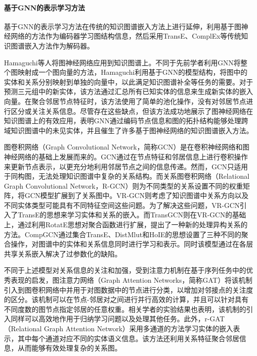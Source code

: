 \paragraph{基于GNN的表示学习方法}
基于GNN的表示学习方法在传统的知识图谱嵌入方法上进行延伸，利用基于图神经网络的方法作为编码器学习图结构信息，然后采用TransE、ComplEx等传统知识图谱嵌入方法作为解码器。

Hamaguchi\cite{hamaguchi2017knowledge}等人将图神经网络应用到知识图谱上。不同于先前学者利用GNN将整个图映射成一个图向量的方法，Hamaguchi利用基于GNN的模型结构，将图中的实体和关系分别映射到单独的向量中，以此满足知识图谱补全等任务的需要。对于预测三元组中的新实体，该方法通过汇总所有已知实体的信息来生成新实体的嵌入向量。在聚合邻居节点特征时，该方法使用了简单的池化操作，没有对邻居节点进行区分或关注关系信息。尽管存在这些缺点，但该方法成功地展示了图神经网络在知识图谱上的有效应用，表明GNN通过编码节点信息和图的拓扑结构能够处理跨域知识图谱中的未见实体，并且催生了许多基于图神经网络的知识图谱嵌入方法。

图卷积网络\cite{kipf2016semi}（Graph Convolutional Network，简称GCN）是在卷积神经网络和图神经网络的基础上发展而来的。GCN通过在节点特征和邻居信息上进行卷积操作来更新节点表示，以更充分地利用邻居节点之间的信息传递。然而，GCN只适用于同构图，无法处理知识图谱中复杂的关系结构。而关系图卷积网络\cite{schlichtkrull2018modeling}（Relational Graph Convolutional Network，R-GCN）则为不同类型的关系设置不同的权重矩阵，将GCN模型扩展到了关系图中。VR-GCN\cite{ye2019vectorized}则考虑了知识图谱中关系方向以及不同实体类型可能具有不同特征空间这些问题。为了解决这些问题，VR-GCN引入了TransE的思想来学习实体和关系的嵌入。而TransGCN\cite{cai2019transgcn}则在VR-GCN的基础上，通过利用RotatE思想对聚合函数进行扩展，提出了一种新的处理异构关系的方法。CompGCN\cite{vashishth2019composition}通过集合TransE、DistMlut和HoIE的思想设置了三种不同的聚合操作，对图谱中的实体和关系信息同时进行学习和表示。同时该模型通过在各层共享关系嵌入解决了过参数化的缺陷。

不同于上述模型对关系信息的关注和加强，受到注意力机制在基于序列任务中的优秀表现的启发，图注意力网络\cite{nathani2019learning}（Graph Attention Networks，简称GAT）将该机制引入到图卷积网络中并用于对图数据中的节点进行分类，以增加对邻接点的关注度的区分。该机制可以在节点-邻居对之间进行并行高效的计算，并且可以针对具有不同度数的图节点指定邻居的任意权重。相关学者的实验结果也表明，该机制的引入同样可以高效地作用于归纳学习问题以及处理其他任务。此外，r-GAT\cite{chen2021r}（Relational Graph Attention Network）采用多通道的方法学习实体的嵌入表示，其中每个通道对应不同的实体语义信息。该方法还利用关系特征聚合邻居信息，从而能够有效处理复杂的关系图。

